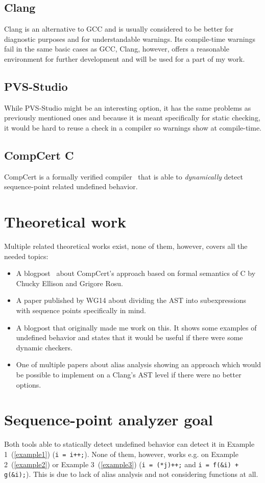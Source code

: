 \subsection{Clang}
Clang is an alternative to GCC and is usually considered to be better for diagnostic purposes and for understandable warnings. Its compile-time warnings fail in the same basic cases as GCC, Clang, however, offers a reasonable environment for further development and will be used for a part of my work.
\subsection{PVS-Studio}
While PVS-Studio might be an interesting option, it has the same problems as previously mentioned ones and because it is meant specifically for static checking, it would be hard to reuse a check in a compiler so warnings show at compile-time.
\subsection{CompCert C}
CompCert is a formally verified compiler~\cite{CompCert} that is able to \emph{dynamically} detect sequence-point related undefined behavior.
\section{Theoretical work}
Multiple related theoretical works exist, none of them, however, covers all the needed topics:
\begin{itemize}
\item A blogpost~\cite{CompCertBlogpost} about CompCert's approach based on formal semantics of C by Chucky Ellison and Grigore Rosu.~\cite{formalSemantics}
\item A paper published by WG14 about dividing the AST into subexpressions with sequence points specifically in mind.~\cite{seqPointWG14}
\item A blogpost that originally made me work on this. It shows some examples of undefined behavior and states that it would be useful if there were some dynamic checkers.~\cite{regehr}
\item One of multiple papers about alias analysis showing an approach which would be possible to implement on a Clang's AST level if there were no better options.~\cite{steensgaard}
\end{itemize}
\section{Sequence-point analyzer goal}
Both tools able to statically detect undefined behavior can detect it in Example 1~(\ref{example1}) (\verb|i = i++;|). None of them, however, works e.g. on Example 2~(\ref{example2}) or Example 3~(\ref{example3}) (\verb|i = (*j)++;| and \verb|i = f(&i) + g(&i);|). This is due to lack of alias analysis and not considering functions at all.

